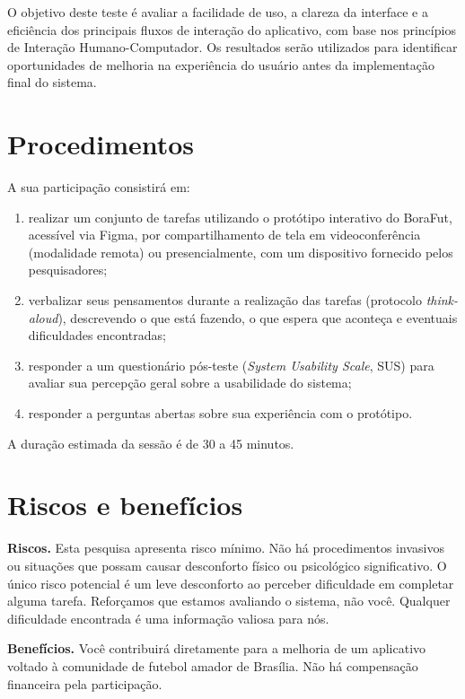 \begin{apendicesenv}
        O objetivo deste teste é avaliar a facilidade de uso, a clareza da interface e a eficiência dos principais fluxos de interação do aplicativo, com base nos princípios de Interação Humano-Computador. Os resultados serão utilizados para identificar oportunidades de melhoria na experiência do usuário antes da implementação final do sistema.

    \section*{Procedimentos}
        A sua participação consistirá em:

        \begin{enumerate}
            \item realizar um conjunto de tarefas utilizando o protótipo interativo do BoraFut, acessível via Figma, por compartilhamento de tela em videoconferência (modalidade remota) ou presencialmente, com um dispositivo fornecido pelos pesquisadores;
            \item verbalizar seus pensamentos durante a realização das tarefas (protocolo \textit{think-aloud}), descrevendo o que está fazendo, o que espera que aconteça e eventuais dificuldades encontradas;
            \item responder a um questionário pós-teste (\textit{System Usability Scale}, SUS) para avaliar sua percepção geral sobre a usabilidade do sistema;
            \item responder a perguntas abertas sobre sua experiência com o protótipo.
        \end{enumerate}

        A duração estimada da sessão é de 30 a 45 minutos.

    \section*{Riscos e benefícios}
        \textbf{Riscos.} Esta pesquisa apresenta risco mínimo. Não há procedimentos invasivos ou situações que possam causar desconforto físico ou psicológico significativo. O único risco potencial é um leve desconforto ao perceber dificuldade em completar alguma tarefa. Reforçamos que estamos avaliando o sistema, não você. Qualquer dificuldade encontrada é uma informação valiosa para nós.

        \textbf{Benefícios.} Você contribuirá diretamente para a melhoria de um aplicativo voltado à comunidade de futebol amador de Brasília. Não há compensação financeira pela participação.


\end{apendicesenv}
